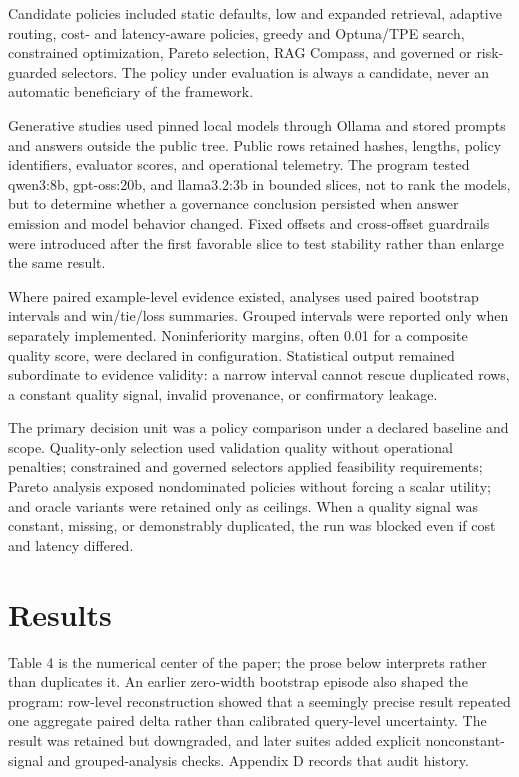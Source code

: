 \documentclass[11pt]{article}
\begin{document}
Candidate policies included static defaults, low and expanded retrieval, adaptive routing, cost- and latency-aware policies, greedy and Optuna/TPE search, constrained optimization, Pareto selection, RAG Compass, and governed or risk-guarded selectors. The policy under evaluation is always a candidate, never an automatic beneficiary of the framework.

Generative studies used pinned local models through Ollama and stored prompts and answers outside the public tree. Public rows retained hashes, lengths, policy identifiers, evaluator scores, and operational telemetry. The program tested qwen3:8b, gpt-oss:20b, and llama3.2:3b in bounded slices, not to rank the models, but to determine whether a governance conclusion persisted when answer emission and model behavior changed. Fixed offsets and cross-offset guardrails were introduced after the first favorable slice to test stability rather than enlarge the same result.

Where paired example-level evidence existed, analyses used paired bootstrap intervals and win/tie/loss summaries. Grouped intervals were reported only when separately implemented. Noninferiority margins, often 0.01 for a composite quality score, were declared in configuration. Statistical output remained subordinate to evidence validity: a narrow interval cannot rescue duplicated rows, a constant quality signal, invalid provenance, or confirmatory leakage.

The primary decision unit was a policy comparison under a declared baseline and scope. Quality-only selection used validation quality without operational penalties; constrained and governed selectors applied feasibility requirements; Pareto analysis exposed nondominated policies without forcing a scalar utility; and oracle variants were retained only as ceilings. When a quality signal was constant, missing, or demonstrably duplicated, the run was blocked even if cost and latency differed.

\section{Results}
Table 4 is the numerical center of the paper; the prose below interprets rather than duplicates it. An earlier zero-width bootstrap episode also shaped the program: row-level reconstruction showed that a seemingly precise result repeated one aggregate paired delta rather than calibrated query-level uncertainty. The result was retained but downgraded, and later suites added explicit nonconstant-signal and grouped-analysis checks. Appendix D records that audit history.
\end{document}

